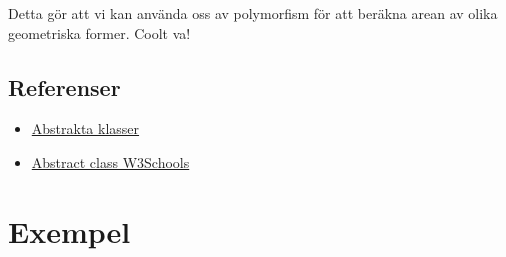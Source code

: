 \hypertarget{cb2}{}
\begin{Shaded}
\begin{Highlighting}[]
\OperatorTok{[]}\OperatorTok{=}  \OperatorTok{[}\OperatorTok{];}

\OperatorTok{[}\OperatorTok{]} \OperatorTok{=}  \OperatorTok{(}\OperatorTok{);}

\OperatorTok{[}\OperatorTok{]} \OperatorTok{=}  \OperatorTok{(}\OperatorTok{,} \OperatorTok{);}

 \OperatorTok{(}\OperatorTok{:}\OperatorTok{)} \OperatorTok{\{}
\OperatorTok{(}\OperatorTok{());}
\OperatorTok{\}}
\end{Highlighting}
\end{Shaded}

Detta gör att vi kan använda oss av polymorfism för att beräkna arean av
olika geometriska former. Coolt va!

\hypertarget{referenser}{%
\subsection{Referenser}\label{referenser}}

\begin{itemize}
\tightlist
\item
  \href{https://docs.microsoft.com/en-us/dotnet/Java/programming-guide/classes-and-structs/abstract-classes}{Abstrakta
  klasser}
\item
  \href{https://www.w3schools.com/cs/cs_abstract.php}{Abstract class
  W3Schools}
\end{itemize}

\hypertarget{exempel}{%
\section{Exempel}\label{exempel}}

